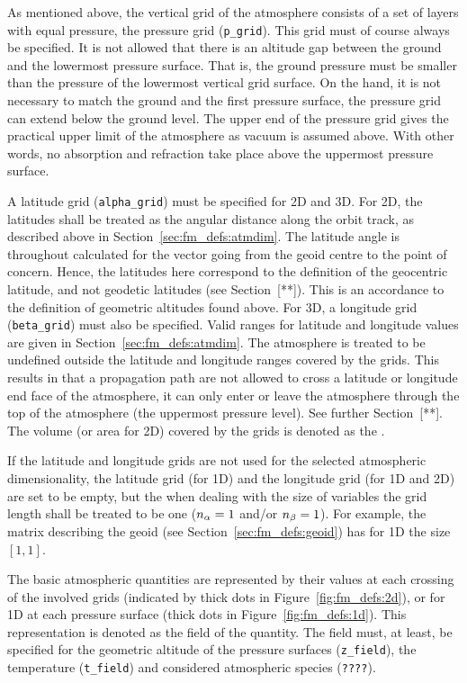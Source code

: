   
\label{sec:fm_defs:grids}

As mentioned above, the vertical grid of the atmosphere consists of a
set of layers with equal pressure, the pressure grid (\verb|p_grid|).
This grid must of course always be specified. It is not allowed that
there is an altitude gap between the ground and the lowermost pressure
surface.  That is, the ground pressure must be smaller than the
pressure of the lowermost vertical grid surface. On the hand, it is
not necessary to match the ground and the first pressure surface, the
pressure grid can extend below the ground level. The upper end of the
pressure grid gives the practical upper limit of the atmosphere as
vacuum is assumed above. With other words, no absorption and
refraction take place above the uppermost pressure surface.

A latitude grid (\verb|alpha_grid|) must be specified for 2D and 3D.
For 2D, the latitudes shall be treated as the angular distance along
the orbit track, as described above in
Section~\ref{sec:fm_defs:atmdim}.  The latitude angle is throughout
calculated for the vector going from the geoid centre to the point of
concern. Hence, the latitudes here correspond to the definition of the
geocentric latitude, and not geodetic latitudes (see Section~[**]).
This is an accordance to the definition of geometric altitudes found
above. For 3D, a longitude grid (\verb|beta_grid|) must also be
specified. Valid ranges for latitude and longitude values are given in
Section~\ref{sec:fm_defs:atmdim}. The atmosphere is treated to be
undefined outside the latitude and longitude ranges covered by the
grids. This results in that a propagation path are not allowed to
cross a latitude or longitude end face of the atmosphere, it can only
enter or leave the atmosphere through the top of the atmosphere (the
uppermost pressure level). See further Section~[**]. The volume (or
area for 2D) covered by the grids is denoted as the .

If the latitude and longitude grids are not used for the selected
atmospheric dimensionality, the latitude grid (for 1D) and the
longitude grid (for 1D and 2D) are set to be empty, but the when
dealing with the size of variables the grid length shall be treated to
be one ($n_{\alpha}=1$ and/or $n_{\beta}=1$). For example,
the matrix describing the geoid (see Section~\ref{sec:fm_defs:geoid})
has for 1D the size $[1,1]$.

The basic atmospheric quantities are represented by their values at
each crossing of the involved grids (indicated by thick dots in
Figure~\ref{fig:fm_defs:2d}), or for 1D at each pressure surface
(thick dots in Figure~\ref{fig:fm_defs:1d}). This representation is
denoted as the field of the quantity. The field must, at least, be
specified for the geometric altitude of the pressure surfaces
(\verb|z_field|), the temperature (\verb|t_field|) and considered
atmospheric species (\verb|????|).

